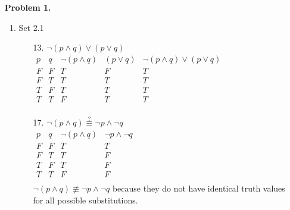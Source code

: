 \documentclass[letterpaper]{article}
\begin{document}
	\begin{enumerate} 
		\item [] \textbf{Problem 1.}
		\begin{enumerate}
			\item Set 2.1 
			\begin{itemize}
				\item [13.] 
				$\neg \left( p \wedge q \right) \vee \left( p \vee q \right)$ \\
				$\begin{array}{c|c|c|c|c}
					p & q & \neg \left( p \wedge q \right) & \left( p \vee q \right) & \neg \left( p \wedge q \right) \vee \left( p \vee q \right) \\ \hline
					F & F & T & F & T \\ \hline
					F & T & T & T & T \\ \hline
					T & F & T & T & T \\ \hline
					T & T & F & T & T \\ 
				\end{array}$
				\item [17.]
				$\neg \left( p \wedge q \right) \stackrel{?}{\equiv} \neg p \wedge \neg q$ \\
				$\begin{array}{c|c|c|c}
					p & q & \neg \left( p \wedge q \right) & \neg p \wedge \neg q \\ \hline
					F & F & T & T \\ \hline
					F & T & T & F \\ \hline
					T & F & T & F \\ \hline
					T & T & F & F \\ 
				\end{array}$ \\
				$\neg \left( p \wedge q \right) \not\equiv \neg p \wedge \neg q$ because they do not have identical truth values for all possible substitutions.
			\end{itemize}
			

\end{enumerate}
\end{enumerate}
\end{document}
